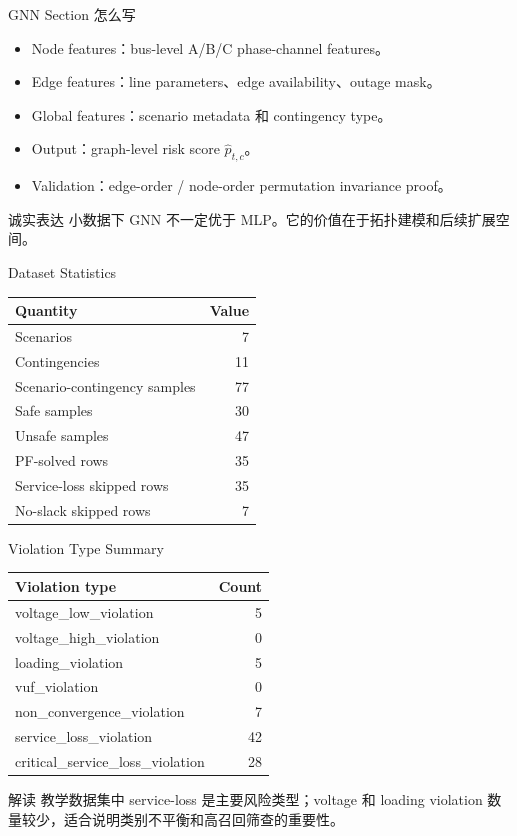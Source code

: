 \documentclass[aspectratio=169,11pt]{beamer}
\begin{document}
\begin{frame}{GNN Section 怎么写}
\begin{itemize}
  \item Node features：bus-level A/B/C phase-channel features。
  \item Edge features：line parameters、edge availability、outage mask。
  \item Global features：scenario metadata 和 contingency type。
  \item Output：graph-level risk score $\hat p_{t,c}$。
  \item Validation：edge-order / node-order permutation invariance proof。
\end{itemize}
\begin{block}{诚实表达}
小数据下 GNN 不一定优于 MLP。它的价值在于拓扑建模和后续扩展空间。
\end{block}
\end{frame}

\begin{frame}{Dataset Statistics}
\centering
\begin{tabular}{lr}
\toprule
Quantity & Value \\
\midrule
Scenarios & 7 \\
Contingencies & 11 \\
Scenario-contingency samples & 77 \\
Safe samples & 30 \\
Unsafe samples & 47 \\
PF-solved rows & 35 \\
Service-loss skipped rows & 35 \\
No-slack skipped rows & 7 \\
\bottomrule
\end{tabular}
\end{frame}

\begin{frame}{Violation Type Summary}
\centering
\scriptsize
\begin{tabular}{lr}
\toprule
Violation type & Count \\
\midrule
voltage\_low\_violation & 5 \\
voltage\_high\_violation & 0 \\
loading\_violation & 5 \\
vuf\_violation & 0 \\
non\_convergence\_violation & 7 \\
service\_loss\_violation & 42 \\
critical\_service\_loss\_violation & 28 \\
\bottomrule
\end{tabular}
\begin{block}{解读}
教学数据集中 service-loss 是主要风险类型；voltage 和 loading violation 数量较少，适合说明类别不平衡和高召回筛查的重要性。
\end{block}
\end{frame}
\end{document}
